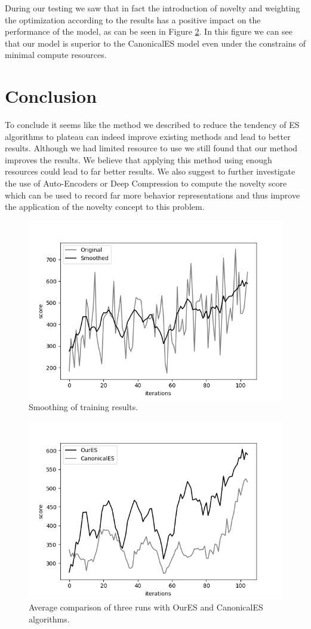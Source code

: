 \documentclass[11 pt, twocolumn]{article}
\begin{document}
During our testing we saw that in fact the introduction of novelty and weighting the optimization according to the results has a positive impact on the performance of the model, as can be seen in Figure \ref{fig:comp_res}. In this figure we can see that our model is superior to the CanonicalES model even under the constrains of minimal compute resources. 

\section{Conclusion}
To conclude it seems like the method we described to reduce the tendency of ES algorithms to plateau can indeed improve existing methods and lead to better results. Although we had limited resource to use we still found that our method improves the results. We believe that applying this method using enough resources could lead to far better results. We also suggest to further investigate the use of Auto-Encoders or Deep Compression to compute the novelty score which can be used to record far more behavior representations and thus improve the application of the novelty concept to this problem.

\begin{figure}[h!]
  \includegraphics[width=\linewidth]{QbertNoiseComparison.png}
  \caption{Smoothing of training results.}
  \label{fig:noise_comp}
\end{figure}

\begin{figure}[h!]
  \includegraphics[width=\linewidth]{averageComparison.png}
  \caption{Average comparison of three runs with OurES and CanonicalES algorithms.}
  \label{fig:comp_res}
\end{figure}

 

\end{document}
